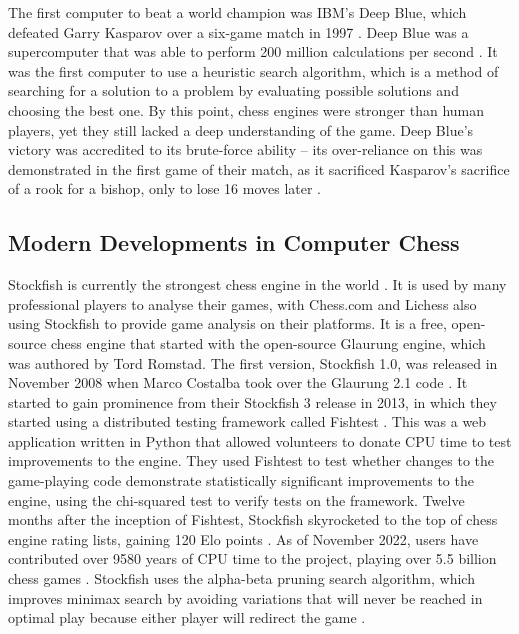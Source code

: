 \documentclass[%
 superscriptaddress,
showpacs,preprintnumbers,
 amsmath,
 amssymb,
 aps,
 pra,
showkeys,
onecolumn,
notitlepage,
11pt,
tightenlines      %
]{revtex4-1}
\begin{document}
The first computer to beat a world champion was IBM's Deep Blue, which defeated Garry Kasparov over a six-game match in 1997 \cite{seirawan1997implications}. Deep Blue was a supercomputer that was able to perform 200 million calculations per second \cite{strogatz2018one}. It was the first computer to use a heuristic search algorithm, which is a method of searching for a solution to a problem by evaluating possible solutions and choosing the best one. By this point, chess engines were stronger than human players, yet they still lacked a deep understanding of the game. Deep Blue's victory was accredited to its brute-force ability -- its over-reliance on this was demonstrated in the first game of their match, as it sacrificed Kasparov's sacrifice of a rook for a bishop, only to lose 16 moves later \cite{strogatz2018one}.

\subsection{Modern Developments in Computer Chess}
Stockfish is currently the strongest chess engine in the world \cite{computerChessRatingLists}. It is used by many professional players to analyse their games, with Chess.com and Lichess also using Stockfish to provide game analysis on their platforms. It is a free, open-source chess engine that started with the open-source Glaurung engine, which was authored by Tord Romstad. The first version, Stockfish 1.0, was released in November 2008 when Marco Costalba took over the Glaurung 2.1 code \cite{aboutStockfish}. It started to gain prominence from their Stockfish 3 release in 2013, in which they started using a distributed testing framework called Fishtest \cite{fishtestDistributedTestingFramework}. This was a web application written in Python that allowed volunteers to donate CPU time to test improvements to the engine. They used Fishtest to test whether changes to the game-playing code demonstrate statistically significant improvements to the engine, using the chi-squared test to verify tests on the framework. Twelve months after the inception of Fishtest, Stockfish skyrocketed to the top of chess engine rating lists, gaining 120 Elo points \cite{stockfishRatingsAfterFishtest}. As of November 2022, users have contributed over 9580 years of CPU time to the project, playing over 5.5 billion chess games \cite{fishtestUsers}. Stockfish uses the alpha-beta pruning search algorithm, which improves minimax search by avoiding variations that will never be reached in optimal play because either player will redirect the game \cite{maharaj2022chess}.
\end{document}
